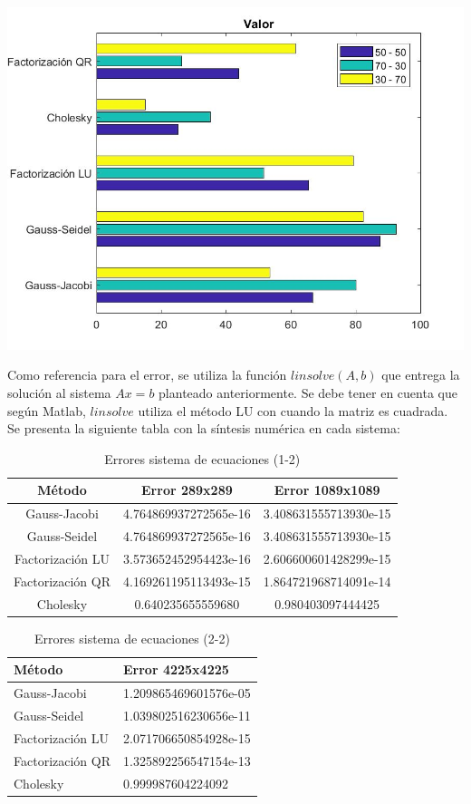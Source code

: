 \documentclass{memoria}
\begin{document}
{\includegraphics[width=15cm]{imagenes/SE/ranking4225.jpg}}

Como referencia para el error, se utiliza la función $linsolve(A, b)$ que entrega la solución al sistema $Ax = b$ planteado anteriormente. Se debe tener en cuenta que según Matlab, $linsolve$ utiliza el método LU con cuando la matriz es cuadrada. Se presenta la siguiente tabla con la síntesis numérica en cada sistema:

\begin{table}[]
\centering
\begin{tabular}{|c|c|c|}
\hline
\textbf{Método} & \textbf{Error 289x289} & \textbf{Error 1089x1089}\\ \hline
Gauss-Jacobi       &  4.764869937272565e-16    & 3.408631555713930e-15 \\ \hline
Gauss-Seidel      & 4.764869937272565e-16     & 3.408631555713930e-15 \\ \hline
Factorización LU & 3.573652452954423e-16 & 2.606600601428299e-15\\ \hline
Factorización QR & 4.169261195113493e-15 & 1.864721968714091e-14\\ \hline
Cholesky         & 0.640235655559680     & 0.980403097444425\\ \hline
\end{tabular}
\caption{Errores sistema de ecuaciones (1-2)}
    \label{tab:my_label}
\end{table}

\begin{table}[]
\centering
\begin{tabular}{|L|L|}
\hline
\textbf{Método} & \textbf{Error 4225x4225}\\ \hline
Gauss-Jacobi      & 1.209865469601576e-05\\ \hline
Gauss-Seidel      & 1.039802516230656e-11\\ \hline
Factorización LU & 2.071706650854928e-15\\ \hline
Factorización QR & 1.325892256547154e-13\\ \hline
Cholesky        & 0.999987604224092\\ \hline
\end{tabular}
\caption{Errores sistema de ecuaciones (2-2)}
    \label{tab:my_label}
\end{table}
\end{document}
